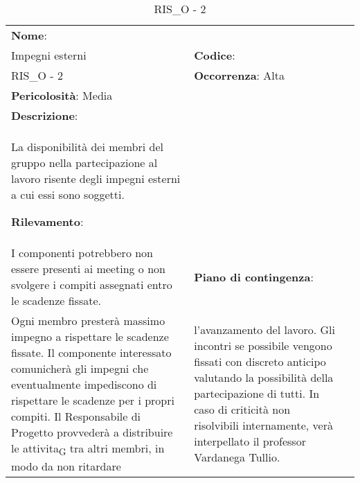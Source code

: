 \renewcommand{\arraystretch}{1.5}
\begin{longtable} { 
		>{\raggedright}p{} 
		>{\raggedright}p{} 
		>{\raggedright}p{}    }
	
	\caption{RIS\_O - 2 } \endhead	
	
	
	\textbf{Nome}: \\ Impegni esterni 
	& \textbf{Codice}: \\ RIS\_O - 2
	& \textbf{Occorrenza}: Alta \\ \textbf{Pericolosità}: Media
	
	\tabularnewline
	
	\textbf{Descrizione}: \\ La disponibilità dei membri del gruppo nella partecipazione al lavoro risente degli impegni esterni a cui essi sono soggetti.
	
	\textbf{Rilevamento}: \\ I componenti potrebbero non essere presenti ai meeting o non svolgere i compiti assegnati entro le scadenze fissate.
	
	& 
	\textbf{Piano di contingenza}: \\ Ogni membro presterà massimo impegno a rispettare le scadenze fissate. Il componente interessato comunicherà gli impegni che eventualmente impediscono di rispettare le scadenze per i propri compiti. Il Responsabile di Progetto provvederà a distribuire le attivita\textsubscript{G} tra altri membri, in modo da non ritardare	
	& 
	l'avanzamento del lavoro. Gli incontri se possibile vengono fissati con discreto anticipo valutando la possibilità della partecipazione di tutti. 
	In caso di criticità non risolvibili internamente, verà interpellato il professor Vardanega Tullio.
	
	
\end{longtable}


